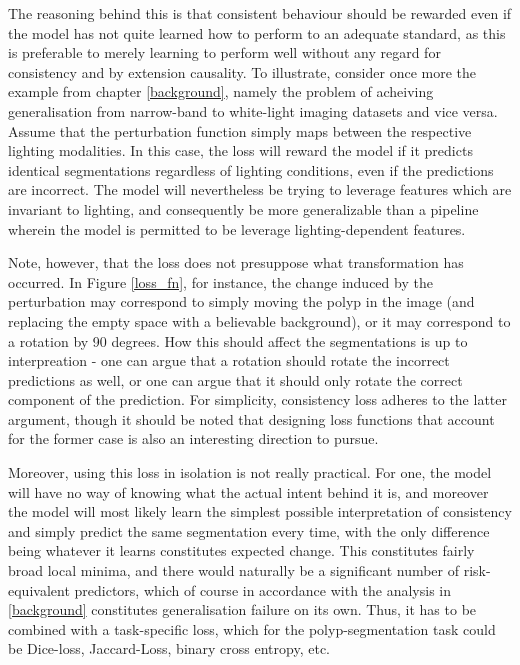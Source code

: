     The reasoning behind this is that consistent behaviour should be rewarded even if the model has not quite learned how to perform to an adequate standard, as this is preferable to merely learning to perform well without any regard for consistency and by extension causality.  To illustrate, consider once more the example from chapter \ref{background}, namely the problem of acheiving generalisation from narrow-band to white-light imaging datasets and vice versa. Assume that the perturbation function simply maps between the respective lighting modalities. In this case, the loss will reward the model if it predicts identical segmentations regardless of lighting conditions, even if the predictions are incorrect. The model will nevertheless be trying to leverage features which are invariant to lighting, and consequently be more generalizable than a pipeline wherein the model is permitted to be leverage lighting-dependent features.
        
    Note, however, that the loss does not presuppose what transformation has occurred. In Figure \ref{loss_fn}, for instance, the change induced by the perturbation may correspond to simply moving the polyp in the image (and replacing the empty space with a believable background), or it may correspond to a rotation by 90 degrees. How this should affect the segmentations is up to interpreation - one can argue that a rotation should rotate the incorrect predictions as well, or one can argue that it should only rotate the correct component of the prediction. For simplicity, consistency loss adheres to the latter argument, though it should be noted that designing loss functions that account for the former case is also an interesting direction to pursue. 
	
	Moreover, using this loss in isolation is not really practical. For one, the model will have no way of knowing what the actual intent behind it is, and moreover the model will most likely learn the simplest possible interpretation of consistency and simply predict the same segmentation every time, with the only difference being whatever it learns constitutes expected change. This constitutes fairly broad local minima, and there would naturally be a significant number of risk-equivalent predictors, which of course in accordance with the analysis in \ref{background} constitutes generalisation failure on its own. Thus, it has to be combined with a task-specific loss, which for the polyp-segmentation task could be Dice-loss, Jaccard-Loss, binary cross entropy, etc. 
	
